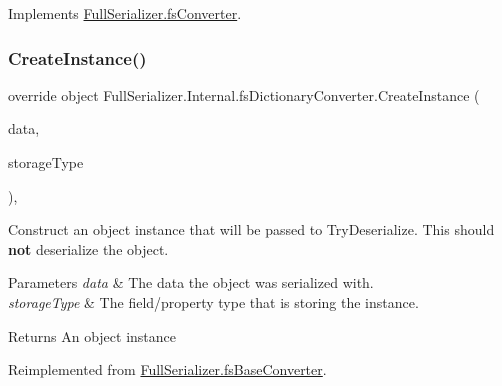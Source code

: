 Implements \hyperlink{class_full_serializer_1_1fs_converter_a6d9e084c5e7f646a8d220705efaecb35}{Full\+Serializer.\+fs\+Converter}.

\mbox{\label{class_full_serializer_1_1_internal_1_1fs_dictionary_converter_aa35564498ee62b6d5e072e845ef0d8f6}} 
\subsubsection{\texorpdfstring{Create\+Instance()}{CreateInstance()}}
{\footnotesize\ttfamily override object Full\+Serializer.\+Internal.\+fs\+Dictionary\+Converter.\+Create\+Instance (\begin{DoxyParamCaption}\item[{\hyperlink{class_full_serializer_1_1fs_data}{fs\+Data}}]{data,  }\item[{Type}]{storage\+Type }\end{DoxyParamCaption})\hspace{0.3cm}{\ttfamily [inline]}, {\ttfamily [virtual]}}



Construct an object instance that will be passed to Try\+Deserialize. This should {\bfseries not} deserialize the object. 


\begin{DoxyParams}{Parameters}
{\em data} & The data the object was serialized with.\\
\hline
{\em storage\+Type} & The field/property type that is storing the instance.\\
\hline
\end{DoxyParams}
\begin{DoxyReturn}{Returns}
An object instance
\end{DoxyReturn}


Reimplemented from \hyperlink{class_full_serializer_1_1fs_base_converter_a415ea2ac9429bbb9927346af7cb7c2e1}{Full\+Serializer.\+fs\+Base\+Converter}.

\mbox{\label{class_full_serializer_1_1_internal_1_1fs_dictionary_converter_a8dc0adbffb181451bb37c6e6a0ed13b8}} 
